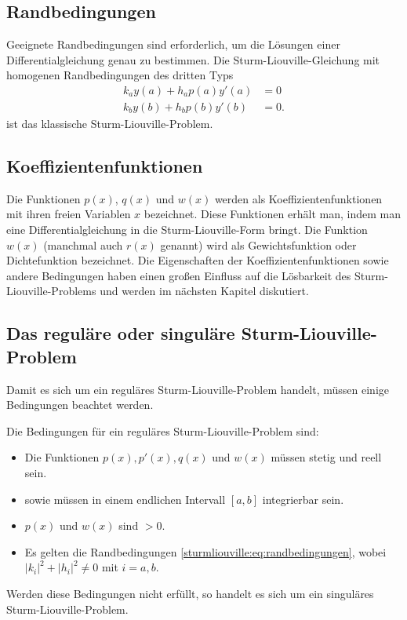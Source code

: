 \subsection{Randbedingungen
\label{sturmliouville:sub:was-ist-das-slp-randbedingungen}}
Geeignete Randbedingungen sind erforderlich, um die Lösungen einer
Differentialgleichung genau zu bestimmen.
Die Sturm-Liouville-Gleichung mit homogenen Randbedingungen des dritten Typs
\begin{equation}
	\begin{aligned}
		\label{sturmliouville:eq:randbedingungen}
		k_a y(a) + h_a p(a) y'(a) &= 0 \\
		k_b y(b) + h_b p(b) y'(b) &= 0.
	\end{aligned}
\end{equation}
ist das klassische Sturm-Liouville-Problem.


\subsection{Koeffizientenfunktionen
\label{sturmliouville:sub:koeffizientenfunktionen}}
Die Funktionen $p(x)$, $q(x)$ und $w(x)$ werden als Koeffizientenfunktionen mit
ihren freien Variablen $x$ bezeichnet.
Diese Funktionen erhält man, indem man eine Differentialgleichung in die
Sturm-Liouville-Form bringt.
Die Funktion $w(x)$ (manchmal auch $r(x)$ genannt) wird als Gewichtsfunktion
oder Dichtefunktion bezeichnet.
Die Eigenschaften der Koeffizientenfunktionen sowie andere Bedingungen haben
einen großen Einfluss auf die Lösbarkeit des Sturm-Liouville-Problems und werden
im nächsten Kapitel diskutiert. 

%
%

\subsection{Das reguläre oder singuläre Sturm-Liouville-Problem
\label{sturmliouville:sub:reguläre_sturm_liouville_problem}}
Damit es sich um ein reguläres Sturm-Liouville-Problem handelt, müssen einige
Bedingungen beachtet werden.
\begin{definition}
	\label{sturmliouville:def:reguläres_sturm-liouville-problem}
	Die Bedingungen für ein reguläres Sturm-Liouville-Problem sind:
	\begin{itemize}
		\item Die Funktionen $p(x), p'(x), q(x)$ und $w(x)$ müssen stetig und
		reell sein.
		\item sowie müssen in einem endlichen Intervall $[a,b]$ integrierbar
		sein.
		\item $p(x)$ und $w(x)$ sind $>0$.
		\item Es gelten die Randbedingungen 
		\eqref{sturmliouville:eq:randbedingungen}, wobei
		$|k_i|^2 + |h_i|^2\ne 0$ mit $i=a,b$.
	\end{itemize}
\end{definition}
Werden diese Bedingungen nicht erfüllt, so handelt es sich um ein singuläres
Sturm-Liouville-Problem.

